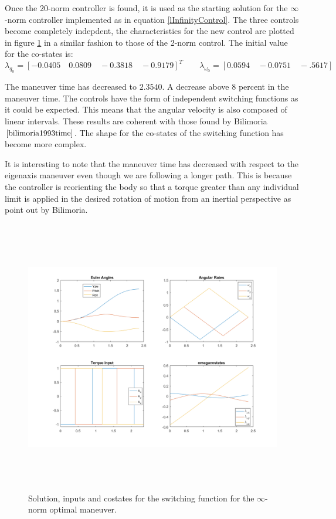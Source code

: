 Once the 20-norm controller is found, it is used as the starting solution for the $\infty$-norm controller implemented as in equation \ref{lInfinityControl}. The three controls become completely indepdent, the characteristics for the new control are plotted in figure \ref{fig:lInftyManeuver} in a similar fashion to those of the 2-norm control. The initial value for the co-states is:
\begin{equation}
\lambda_{q_0} = [-0.0405 \quad 0.0809 \quad -0.3818 \quad -0.9179]^T \qquad
\lambda_{\omega_0} = [0.0594 \quad -0.0751 \quad -.5617]
\end{equation}

The maneuver time has decreased to $2.3540$. A decrease above 8 percent in the maneuver time. The controls have the form of independent switching functions as it could be expected. This means that the angular velocity is also composed of linear intervals. These results are coherent with those found by Bilimoria$\cite{bilimoria1993time}$. The shape for the co-states of the switching function has become more complex.

It is interesting to note that the maneuver time has decreased with respect to the eigenaxis maneuver even though we are following a longer path. This is because the controller is reorienting the body so that a torque greater than any individual limit is applied in the desired rotation of motion from an inertial perspective as point out by Bilimoria\cite{bilimoria1993time}.

\begin{figure}[H]
	\centering
	\includegraphics[height=12cm,keepaspectratio]{media/lInftyManeuver.png}
	\caption{Solution, inputs and costates for the switching function for the $\infty$-norm optimal maneuver.}
	\label{fig:lInftyManeuver}
\end{figure}